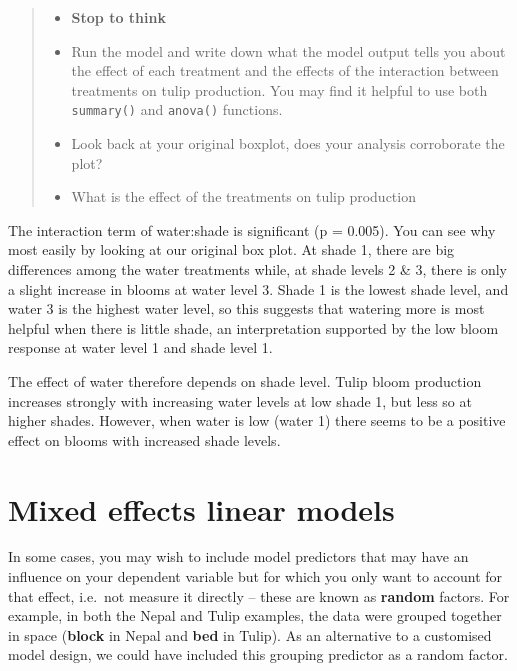 \documentclass[
]{book}
\providecommand{\tightlist}{%
  \setlength{\itemsep}{0pt}\setlength{\parskip}{0pt}}
\begin{document}
\begin{quote}
\begin{itemize}
\tightlist
\item
  \textbf{Stop to think}
\item
  Run the model and write down what the model output tells you about the effect of each treatment and the effects of the interaction between treatments on tulip production. You may find it helpful to use both \texttt{summary()} and \texttt{anova()} functions.\\
\item
  Look back at your original boxplot, does your analysis corroborate the plot?
\item
  What is the effect of the treatments on tulip production
\end{itemize}
\end{quote}

The interaction term of water:shade is significant (p = 0.005). You can see why most easily by looking at our original box plot. At shade 1, there are big differences among the water treatments while, at shade levels 2 \& 3, there is only a slight increase in blooms at water level 3. Shade 1 is the lowest shade level, and water 3 is the highest water level, so this suggests that watering more is most helpful when there is little shade, an interpretation supported by the low bloom response at water level 1 and shade level 1.

The effect of water therefore depends on shade level. Tulip bloom production increases strongly with increasing water levels at low shade 1, but less so at higher shades. However, when water is low (water 1) there seems to be a positive effect on blooms with increased shade levels.

\section{Mixed effects linear models}\label{mixed-effects-linear-models}

In some cases, you may wish to include model predictors that may have an influence on your dependent variable but for which you only want to account for that effect, i.e.~not measure it directly -- these are known as \textbf{random} factors. For example, in both the Nepal and Tulip examples, the data were grouped together in space (\textbf{block} in Nepal and \textbf{bed} in Tulip). As an alternative to a customised model design, we could have included this grouping predictor as a random factor.
\end{document}
